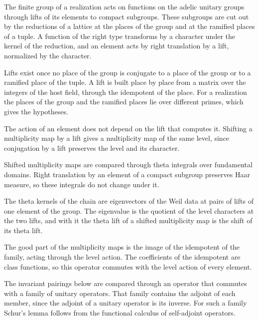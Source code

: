 The finite group of a realization acts on functions on the adelic unitary groups through lifts of
its elements to compact subgroups. These subgroups are cut out by the reductions of a lattice at the
places of the group and at the ramified places of a tuple. A function of the right type transforms
by a character under the kernel of the reduction, and an element acts by right translation by a
lift, normalized by the character.

Lifts exist once no place of the group is conjugate to a place of the group or to a ramified place
of the tuple. A lift is built place by place from a matrix over the integers of the host field,
through the idempotent of the place. For a realization the places of the group and the ramified
places lie over different primes, which gives the hypotheses.

The action of an element does not depend on the lift that computes it. Shifting a multiplicity map
by a lift gives a multiplicity map of the same level, since conjugation by a lift preserves the level
and its character.

Shifted multiplicity maps are compared through theta integrals over fundamental domains. Right
translation by an element of a compact subgroup preserves Haar measure, so these integrals do not
change under it.

The theta kernels of the chain are eigenvectors of the Weil data at pairs of lifts of one element of
the group. The eigenvalue is the quotient of the level characters at the two lifts, and with it the
theta lift of a shifted multiplicity map is the shift of its theta lift.

The good part of the multiplicity maps is the image of the idempotent of the family, acting through
the level action. The coefficients of the idempotent are class functions, so this operator commutes
with the level action of every element.

The invariant pairings below are compared through an operator that commutes with a family of unitary
operators. That family contains the adjoint of each member, since the adjoint of a unitary operator is
its inverse. For such a family Schur's lemma follows from the functional calculus of self-adjoint
operators.

